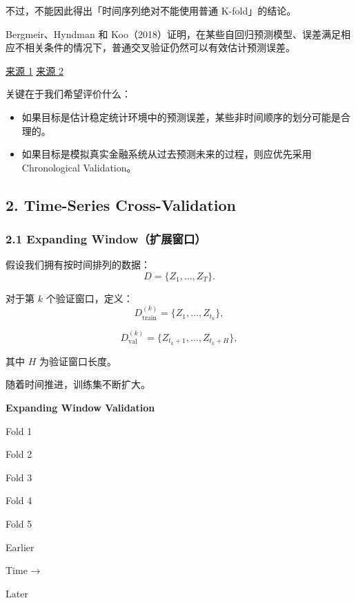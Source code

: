 不过，不能因此得出「时间序列绝对不能使用普通 K-fold」的结论。

Bergmeir、Hyndman 和 Koo（2018）证明，在某些自回归预测模型、误差满足相应不相关条件的情况下，普通交叉验证仍然可以有效估计预测误差。

\href{https://robjhyndman.com/publications/cv-time-series/}{来源 1} \href{https://doi.org/10.1016\%2Fj.csda.2017.11.003}{来源 2}

关键在于我们希望评价什么：

\begin{itemize}
\tightlist
\item
  如果目标是估计稳定统计环境中的预测误差，某些非时间顺序的划分可能是合理的。
\item
  如果目标是模拟真实金融系统从过去预测未来的过程，则应优先采用 Chronological Validation。
\end{itemize}

\hypertarget{part-2-27-0001-time-series-cross-validation}{%
\subsection{2. Time-Series Cross-Validation}\label{part-2-27-0001-time-series-cross-validation}}

\hypertarget{part-2-27-0001-expanding-windowux6269ux5c55ux7a97ux53e3}{%
\subsubsection{2.1 Expanding Window（扩展窗口）}\label{part-2-27-0001-expanding-windowux6269ux5c55ux7a97ux53e3}}

假设我们拥有按时间排列的数据：
\[D=\{Z_1,\ldots,Z_T\}.\]

对于第 \(k\) 个验证窗口，定义：
\[D_{\mathrm{train}}^{(k)}
=
\{Z_1,\ldots,Z_{t_k}\},\]

\[D_{\mathrm{val}}^{(k)}
=
\{Z_{t_k+1},\ldots,Z_{t_k+H}\},\]

其中 \(H\) 为验证窗口长度。

随着时间推进，训练集不断扩大。

\textbf{Expanding Window Validation}

Fold 1

Fold 2

Fold 3

Fold 4

Fold 5

Earlier

Time →

Later

